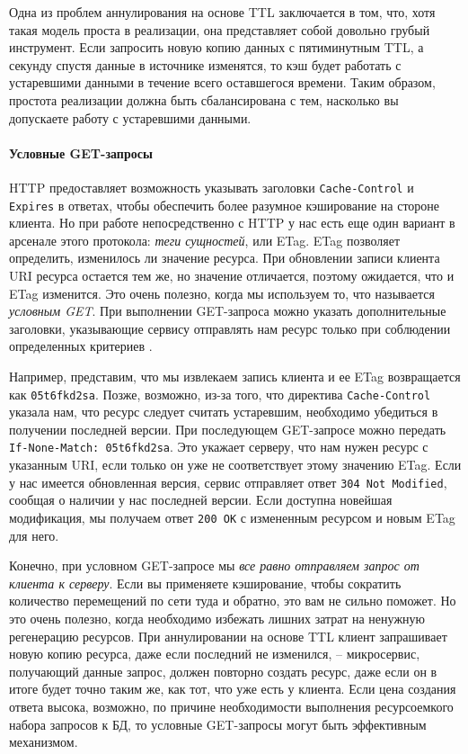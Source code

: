 \documentclass[%
	11pt,
	a4paper,
	utf8,
		]{article}
\begin{document}
Одна из проблем аннулирования на основе TTL заключается в том, что, хотя такая модель проста в реализации, она представляет собой довольно грубый инструмент. Если запросить новую копию данных с пятиминутным TTL, а секунду спустя данные в источнике изменятся, то кэш будет работать с устаревшими данными в течение всего оставшегося времени. Таким образом, простота реализации должна быть сбалансирована с тем, насколько вы допускаете работу с устаревшими данными.

\paragraph{Условные GET-запросы} HTTP предоставляет возможность указывать заголовки \verb|Cache-Control| и \verb|Expires| в ответах, чтобы обеспечить более разумное кэширование на стороне клиента. Но при работе непосредственно с HTTP у нас есть еще один вариант в арсенале этого протокола: \emph{теги сущностей}, или ETag. ETag позволяет определить, изменилось ли значение ресурса. При обновлении записи клиента URI ресурса остается тем же, но значение отличается, поэтому ожидается, что и ETag изменится. Это очень полезно, когда мы используем то, что называется \emph{условным GET}. При выполнении GET-запроса можно указать дополнительные заголовки, указывающие сервису отправлять нам ресурс только при соблюдении определенных критериев \cite[]{microservices-2024}.

Например, представим, что мы извлекаем запись клиента и ее ETag возвращается как \verb|05t6fkd2sa|. Позже, возможно, из-за того, что директива \verb|Cache-Control| указала нам, что ресурс следует считать устаревшим, необходимо убедиться в получении последней версии. При последующем GET-запросе можно передать \verb|If-None-Match: 05t6fkd2sa|. Это укажает серверу, что нам нужен ресурс с указанным URI, если только он уже не соответствует этому значению ETag. Если у нас имеется обновленная версия, сервис отправляет ответ \verb|304 Not Modified|, сообщая о наличии у нас последней версии. Если доступна новейшая модификация, мы получаем ответ \verb|200 OK| с измененным ресурсом и новым ETag для него.

Конечно, при условном GET-запросе мы \emph{\color{red}все равно отправляем запрос от клиента к серверу}. Если вы применяете кэширование, чтобы сократить количество перемещений по сети туда и обратно, это вам не сильно поможет. Но это очень полезно, когда необходимо избежать лишних затрат на ненужную регенерацию ресурсов. При аннулировании на основе TTL клиент запрашивает новую копию ресурса, даже если последний не изменился, -- микросервис, получающий данные запрос, должен повторно создать ресурс, даже если он в итоге будет точно таким же, как тот, что уже есть у клиента. Если цена создания ответа высока, возможно, по причине необходимости выполнения ресурсоемкого набора запросов к БД, то условные GET-запросы могут быть эффективным механизмом.
\end{document}
